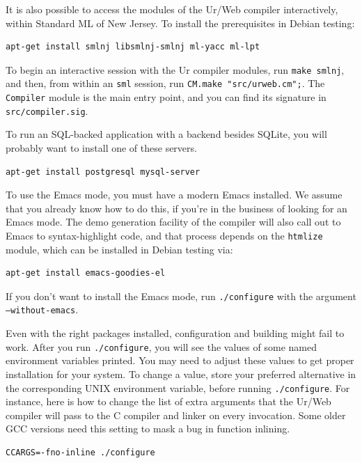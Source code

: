 \documentclass{article}
\begin{document}
It is also possible to access the modules of the Ur/Web compiler interactively, within Standard ML of New Jersey.  To install the prerequisites in Debian testing:
\begin{verbatim}
apt-get install smlnj libsmlnj-smlnj ml-yacc ml-lpt
\end{verbatim}

To begin an interactive session with the Ur compiler modules, run \texttt{make smlnj}, and then, from within an \texttt{sml} session, run \texttt{CM.make "src/urweb.cm";}.  The \texttt{Compiler} module is the main entry point, and you can find its signature in \texttt{src/compiler.sig}.

To run an SQL-backed application with a backend besides SQLite, you will probably want to install one of these servers.

\begin{verbatim}
apt-get install postgresql mysql-server
\end{verbatim}

To use the Emacs mode, you must have a modern Emacs installed.  We assume that you already know how to do this, if you're in the business of looking for an Emacs mode.  The demo generation facility of the compiler will also call out to Emacs to syntax-highlight code, and that process depends on the \texttt{htmlize} module, which can be installed in Debian testing via:

\begin{verbatim}
apt-get install emacs-goodies-el
\end{verbatim}

If you don't want to install the Emacs mode, run \texttt{./configure} with the argument \texttt{--without-emacs}.

Even with the right packages installed, configuration and building might fail to work.  After you run \texttt{./configure}, you will see the values of some named environment variables printed.  You may need to adjust these values to get proper installation for your system.  To change a value, store your preferred alternative in the corresponding UNIX environment variable, before running \texttt{./configure}.  For instance, here is how to change the list of extra arguments that the Ur/Web compiler will pass to the C compiler and linker on every invocation.  Some older GCC versions need this setting to mask a bug in function inlining.

\begin{verbatim}
CCARGS=-fno-inline ./configure
\end{verbatim}
\end{document}
